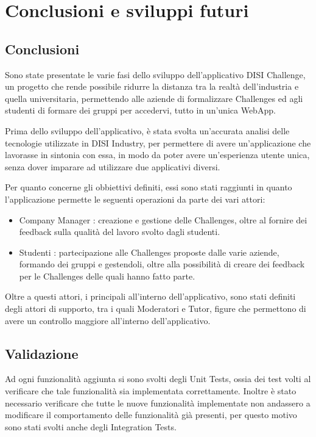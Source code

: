 \chapter{Conclusioni e sviluppi futuri}
\label{cha:conclusioni}

\section{Conclusioni}
Sono state presentate le varie fasi dello sviluppo dell'applicativo DISI Challenge, un progetto che rende possibile ridurre la distanza tra la realtà dell'industria e quella universitaria, permettendo alle aziende di formalizzare Challenges ed agli studenti di formare dei gruppi per accedervi, tutto in un'unica WebApp.

Prima dello sviluppo dell'applicativo, è stata svolta un'accurata analisi delle tecnologie utilizzate in DISI Industry, per permettere di avere un'applicazione che lavorasse in sintonia con essa, in modo da poter avere un'esperienza utente unica, senza dover imparare ad utilizzare due applicativi diversi.

Per quanto concerne gli obbiettivi definiti, essi sono stati raggiunti in quanto l'applicazione permette le seguenti operazioni da parte dei vari attori:
\begin{itemize}
    \item Company Manager : creazione e gestione delle Challenges, oltre al fornire dei feedback sulla qualità del lavoro svolto dagli studenti.
    \item Studenti : partecipazione alle Challenges proposte dalle varie aziende, formando dei gruppi e gestendoli, oltre alla possibilità di creare dei feedback per le Challenges delle quali hanno fatto parte.
\end{itemize}

Oltre a questi attori, i principali all'interno dell'applicativo, sono stati definiti degli attori di supporto, tra i quali Moderatori e Tutor, figure che permettono di avere un controllo maggiore all'interno dell'applicativo.



\section{Validazione}
Ad ogni funzionalità aggiunta si sono svolti degli Unit Tests, ossia dei test volti al verificare che tale funzionalità sia implementata correttamente. Inoltre è stato necessario verificare che tutte le nuove funzionalità implementate non andassero a modificare il comportamento delle funzionalità già presenti, per questo motivo sono stati svolti anche degli Integration Tests.

